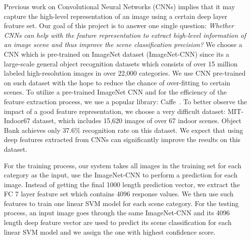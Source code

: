
Previous work on Convolutional Neural Networks (CNNs) implies that it may
capture the high-level representation of an image using a certain deep layer
feature set. Our goal of this project is to answer one single question:
\emph{Whether CNNs can help with the feature representation to extract
high-level information of an image scene and thus improve the scene
classification precision?} We choose a CNN which is pre-trained on ImageNet
dataset (ImageNet-CNN) since its a large-scale general object recognition
datasets which consists of over 15 million labeled high-resolution images in
over 22,000 categories. We use CNN pre-trained on such dataset with the hope to
reduce the chance of over-fitting to certain scenes.  To utilize a pre-trained
ImageNet CNN and for the efficiency of the feature extraction process, we use
a popular library: Caffe~\cite{Jia:2014:CCA}. To better observe the impact of a good
feature representation, we choose a very difficult dataset: MIT-Indoor67 dataset,
which includes 15,620 images of over 67 indoor scenes. Object Bank achieves
only 37.6\% recognition rate on this dataset. We expect that using deep features
extracted from CNNs can significantly improve the results on this dataset.

For the training process, our system takes all images in the training set for
each category as the input, use the ImageNet-CNN to perform a prediction for
each image. Instead of getting the final 1000 length prediction vector, we
extract the FC 7 layer feature set which contains 4096 response values. We then
use such features to train one linear SVM model for each scene category. For
the testing process, an input image goes through the same ImageNet-CNN and its
4096 length deep feature vector are used to predict its scene classification
for each linear SVM model and we assign the one with highest confidence score.

